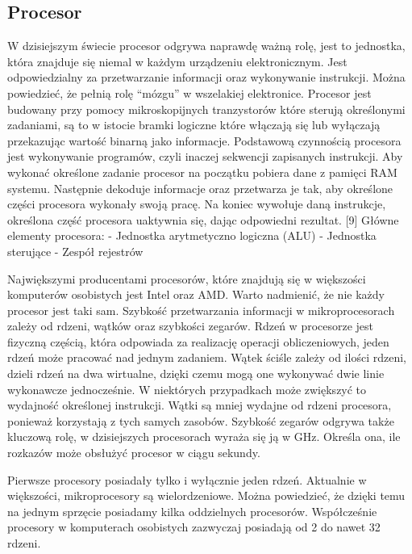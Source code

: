 \documentclass[12pt, a4paper, onside, polish]{article}				%
\begin{document}
\subsection{Procesor}
\hspace{\parindent}
W dzisiejszym świecie procesor odgrywa naprawdę ważną rolę, jest to jednostka, która znajduje się niemal w każdym urządzeniu elektronicznym. Jest odpowiedzialny za przetwarzanie informacji oraz wykonywanie instrukcji. Można powiedzieć, że pełnią rolę “mózgu” w wszelakiej elektronice. Procesor jest budowany przy pomocy mikroskopijnych tranzystorów które sterują określonymi zadaniami, są to w istocie bramki logiczne które włączają się lub wyłączają przekazując wartość binarną jako informacje. Podstawową czynnością procesora jest wykonywanie programów, czyli inaczej sekwencji zapisanych instrukcji. Aby wykonać określone zadanie procesor na początku pobiera dane z pamięci RAM systemu. Następnie dekoduje informacje oraz przetwarza je tak, aby określone części procesora wykonały swoją pracę. Na koniec wywołuje daną instrukcje, określona część procesora uaktywnia się, dając odpowiedni rezultat. [9]
\newline\newline
Główne elementy procesora:  
\newline
- Jednostka arytmetyczno logiczna (ALU) \newline
- Jednostka sterujące \newline
- Zespół rejestrów \newline

 
	Największymi producentami procesorów, które znajdują się w większości komputerów osobistych jest Intel oraz AMD. Warto nadmienić, że nie każdy procesor jest taki sam. Szybkość przetwarzania informacji w mikroprocesorach zależy od rdzeni, wątków oraz szybkości zegarów.  
Rdzeń w procesorze jest fizyczną częścią, która odpowiada za realizację operacji obliczeniowych, jeden rdzeń może pracować nad jednym zadaniem. Wątek ściśle zależy od ilości rdzeni, dzieli rdzeń na dwa wirtualne, dzięki czemu mogą one wykonywać dwie linie wykonawcze jednocześnie. W niektórych przypadkach może zwiększyć to wydajność określonej instrukcji. Wątki są mniej wydajne od rdzeni procesora, ponieważ korzystają z tych samych zasobów. Szybkość zegarów odgrywa także kluczową rolę, w dzisiejszych procesorach wyraża się ją w GHz. Określa ona, ile rozkazów może obsłużyć procesor w ciągu sekundy. 

Pierwsze procesory posiadały tylko i wyłącznie jeden rdzeń. Aktualnie w większości, mikroprocesory są wielordzeniowe. Można powiedzieć, że dzięki temu na jednym sprzęcie posiadamy kilka oddzielnych procesorów. Współcześnie procesory w komputerach osobistych zazwyczaj posiadają od 2 do nawet 32 rdzeni. 
\end{document}
